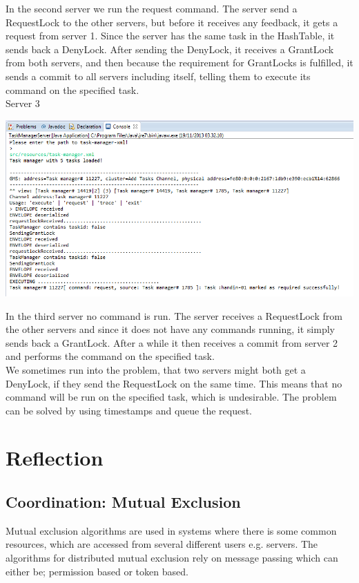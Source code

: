 In the second server we run the request command. The server send a RequestLock to the other servers, but before it receives any feedback, it gets a request from server 1. Since the server has the same task in the HashTable, it sends back a DenyLock. After sending the DenyLock, it receives a GrantLock from both servers, and then because the requirement for GrantLocks is fulfilled, it sends a commit to all servers including itself, telling them to execute its command on the specified task. \\

\caption{Server 3}
\includegraphics[scale=0.6]{images/CCServer3.png}

In the third server no command is run. The server receives a RequestLock from the other servers and since it does not have any commands running, it simply sends back a GrantLock. After a while it then receives a commit from server 2 and performs the command on the specified task. \\

We sometimes run into the problem, that two servers might both get a DenyLock, if they send the RequestLock on the same time. This means that no command will be run on the specified task, which is undesirable. The problem can be solved by using timestamps and queue the request.

\section{Reflection}
\label{MutualExclusion_motivation}



\subsection{Coordination: Mutual Exclusion}
Mutual exclusion algorithms are used in systems where there is some common resources, which are accessed from several different users e.g. servers. The algorithms for distributed mutual exclusion rely on message passing which can either be; permission based or token based. \\

